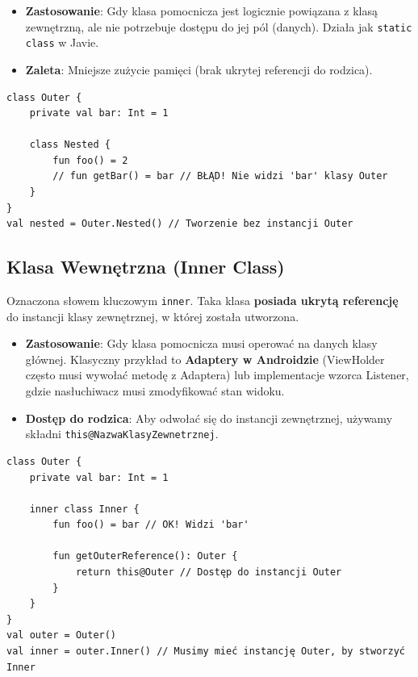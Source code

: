\begin{itemize}
    \item \textbf{Zastosowanie}: Gdy klasa pomocnicza jest logicznie powiązana z klasą zewnętrzną, ale nie potrzebuje dostępu do jej pól (danych). Działa jak \texttt{static class} w Javie.
    \item \textbf{Zaleta}: Mniejsze zużycie pamięci (brak ukrytej referencji do rodzica).
\end{itemize}

\begin{verbatim}
class Outer {
    private val bar: Int = 1
    
    class Nested {
        fun foo() = 2
        // fun getBar() = bar // BŁĄD! Nie widzi 'bar' klasy Outer
    }
}
val nested = Outer.Nested() // Tworzenie bez instancji Outer
\end{verbatim}

\subsection{Klasa Wewnętrzna (Inner Class)}
Oznaczona słowem kluczowym \texttt{inner}. Taka klasa \textbf{posiada ukrytą referencję} do instancji klasy zewnętrznej, w której została utworzona.

\begin{itemize}
    \item \textbf{Zastosowanie}: Gdy klasa pomocnicza musi operować na danych klasy głównej. Klasyczny przykład to \textbf{Adaptery w Androidzie} (ViewHolder często musi wywołać metodę z Adaptera) lub implementacje wzorca Listener, gdzie nasłuchiwacz musi zmodyfikować stan widoku.
    \item \textbf{Dostęp do rodzica}: Aby odwołać się do instancji zewnętrznej, używamy składni \texttt{this@NazwaKlasyZewnetrznej}.
\end{itemize}

\begin{verbatim}
class Outer {
    private val bar: Int = 1
    
    inner class Inner {
        fun foo() = bar // OK! Widzi 'bar'
        
        fun getOuterReference(): Outer {
            return this@Outer // Dostęp do instancji Outer
        }
    }
}
val outer = Outer()
val inner = outer.Inner() // Musimy mieć instancję Outer, by stworzyć Inner
\end{verbatim}

